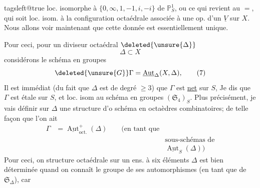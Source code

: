 \begingroup\csname tagsleft@true\endcsname
loc. isomorphe à \(\{0,\infty,1,-1,i,-i\}\) de \(\mathbb P^1_S\), ou ce qui revient au \(=\), qui soit loc. isom. à la configuration octaédrale associée à une op.  d'un \(\underline V\) sur \(X\). Nous allons voir maintenant que cette donnée est essentiellement unique.

Pour ceci, pour un diviseur octaédral \(\deleted{\unsure{\Delta}}\)
\[
\Delta\subset X
\]
considérons le schéma en groupes
\[
\deleted{\unsure{G}}\Gamma=\underline{\operatorname{Aut}}_{\Delta}(X,\Delta), \tag*{(7)}
\]
Il est immédiat (du fait que \(\Delta\) est de degré \(\geq3\)) que \(\Gamma\) est \uline{net} sur \(S\),  Je dis que \(\Gamma\) est étale sur \(S\), et loc. isom au schéma en groupes \((\mathfrak S_4)_S\). Plus précisément, je vais définir sur \(\Delta\)  une structure d'o schéma en octaèdres combinatoires; de telle façon que l'on ait
\[
\begin{aligned}
\Gamma&=\underline{\operatorname{Aut}}^{+}_{\mathrm{oct.}}(\Delta)
\qquad\bigl(\text{en tant que}\\
&&\text{sous-schémas de}\\
&&\underline{\operatorname{Aut}}_S(\Delta)\bigr)
\end{aligned} \tag*{(8)}
\]
Pour ceci, on   structure octaédrale sur un ens. à six éléments \(\Delta\) est bien déterminée quand on connaît le groupe de ses automorphismes  (en tant que  de \(\mathfrak S_{\Delta}\)), car
\endgroup
